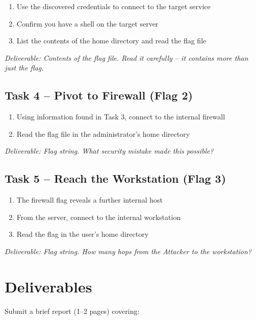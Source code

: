 \documentclass[a4paper, 12pt]{article}
\begin{document}
\begin{enumerate}[leftmargin=2em]
  \item Use the discovered credentials to connect to the target service
  \item Confirm you have a shell on the target server
  \item List the contents of the home directory and read the flag file
\end{enumerate}

\textit{Deliverable: Contents of the flag file. Read it carefully -- it contains more than just the flag.}

\subsection{Task 4 -- Pivot to Firewall (Flag 2)}

\begin{enumerate}[leftmargin=2em]
  \item Using information found in Task 3, connect to the internal firewall
  \item Read the flag file in the administrator's home directory
\end{enumerate}

\textit{Deliverable: Flag string. What security mistake made this possible?}

\subsection{Task 5 -- Reach the Workstation (Flag 3)}

\begin{enumerate}[leftmargin=2em]
  \item The firewall flag reveals a further internal host
  \item From the server, connect to the internal workstation
  \item Read the flag in the user's home directory
\end{enumerate}

\textit{Deliverable: Flag string. How many hops from the Attacker to the workstation?}

\section{Deliverables}

Submit a brief report (1--2 pages) covering:
\end{document}
